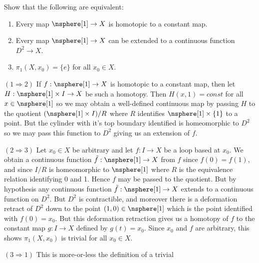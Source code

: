 \documentclass{article}                                                        %
\begin{document}
    \begin{problem}
        Show that the following are equivalent:
        \begin{enumerate}
            \item Every map $\nsphere[1]\rightarrow{X}$ is homotopic to a
                  constant map.
            \item Every map $\nsphere[1]\rightarrow{X}$ can be extended to a
                  continuous function $D^{2}\rightarrow{X}$.
            \item $\pi_{1}(X,x_{0})=\{e\}$ for all $x_{0}\in{X}$.
        \end{enumerate}
    \end{problem}
    \begin{solution}
        $(1\Rightarrow{2})$ If $f:\nsphere[1]\rightarrow{X}$ is homotopic to a
        constant map, then let $H:\nsphere[1]\times{I}\rightarrow{X}$ be such a
        homotopy. Then $H(x,1)=const$ for all $x\in\nsphere[1]$ so we may obtain
        a well-defined continuous map by passing $H$ to the quotient
        $(\nsphere[1]\times{I})/R$ where $R$ identifies $\nsphere[1]\times\{1\}$
        to a point. But the cylinder with it's top boundary identified is
        homeomorphic to $D^{2}$ so we may pass this function to $D^{2}$ giving
        us an extension of $f$.
        \par\hfill\par
        $(2\Rightarrow{3})$ Let $x_{0}\in{X}$ be arbitrary and let
        $f:I\rightarrow{X}$ be a loop based at $x_{0}$. We obtain a continuous
        function $\tilde{f}:\nsphere[1]\rightarrow{X}$ from $f$ since
        $f(0)=f(1)$, and since $I/R$ is homeomorphic to $\nsphere[1]$
        where $R$ is the equivalence relation identifying 0 and 1. Hence $f$ may
        be passed to the quotient. But by hypothesis any continuous function
        $\tilde{f}:\nsphere[1]\rightarrow{X}$ extends to a continuous function
        on $D^{2}$. But $D^{2}$ is contractible, and moreover there is a
        deformation retract of $D^{2}$ down to the point $(1,0)\in\nsphere[1]$
        which is the point identified with $f(0)=x_{0}$.
        But this deformation retraction gives us a homotopy of
        $f$ to the constant map $g:I\rightarrow{X}$ defined by $g(t)=x_{0}$.
        Since $x_{0}$ and $f$ are arbitrary, this shows $\pi_{1}(X,x_{0})$ is
        trivial for all $x_{0}\in{X}$.
        \par\hfill\par
        $(3\Rightarrow{1})$ This is more-or-less the definition of a trivial

\end{solution}
\end{document}
